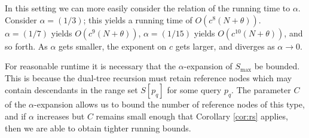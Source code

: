 


In this setting we can more easily consider the relation of the running time to
$\alpha$.  Consider $\alpha = (1 / 3)$; this yields a running time of $O(c^8 (N
+ \theta))$.  $\alpha = (1 / 7)$ yields $O(c^9 (N + \theta))$, $\alpha = (1 /
15)$ yields $O(c^{10} (N + \theta))$, and so forth.  As $\alpha$ gets smaller,
the exponent on $c$ gets larger, and diverges as $\alpha \to 0$.

For reasonable runtime it is necessary that the $\alpha$-expansion of $S_{\max}$
be bounded.  This is because the dual-tree recursion must retain reference nodes
which may contain descendants in the range set $S[p_q]$ for some query $p_q$.
The parameter $C$ of the $\alpha$-expansion allows us to bound the number of
reference nodes of this type, and if $\alpha$ increases but $C$ remains small
enough that Corollary \ref{cor:rs} applies, then we are able to obtain tighter
running bounds.



